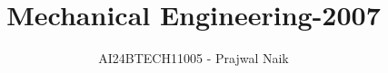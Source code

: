 \documentclass[journal]{IEEEtran}
\begin{document}

\vspace{3cm}

\title{Mechanical Engineering-2007}
\author{AI24BTECH11005 - Prajwal Naik}
{\let\newpage\relax\maketitle}

\renewcommand{\thefigure}{\theenumi}
\renewcommand{\thetable}{\theenumi}
\setlength{\intextsep}{10pt} %


\renewcommand{\thetable}{\theenumi}
\end{document}
